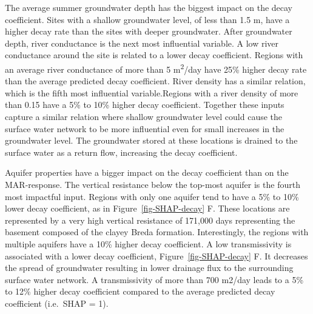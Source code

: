 \documentclass[
]{agujournal2019}
\begin{document}
The average summer groundwater depth has the biggest impact on the decay
coefficient. Sites with a shallow groundwater level, of less than 1.5 m,
have a higher decay rate than the sites with deeper groundwater. After
groundwater depth, river conductance is the next most influential
variable. A low river conductance around the site is related to a lower
decay coefficient. Regions with an average river conductance of more
than 5 m\textsuperscript{2}/day have 25\% higher decay rate than the
average predicted decay coefficient. River density has a similar
relation, which is the fifth most influential variable.Regions with a
river density of more than 0.15 have a 5\% to 10\% higher decay
coefficient. Together these inputs capture a similar relation where
shallow groundwater level could cause the surface water network to be
more influential even for small increases in the groundwater level. The
groundwater stored at these locations is drained to the surface water as
a return flow, increasing the decay coefficient.

Aquifer properties have a bigger impact on the decay coefficient than on
the MAR-response. The vertical resistance below the top-most aquifer is
the fourth most impactful input. Regions with only one aquifer tend to
have a 5\% to 10\% lower decay coefficient, as in
Figure~\ref{fig-SHAP-decay} F. These locations are represented by a very
high vertical resistance of 171,000 days representing the basement
composed of the clayey Breda formation. Interestingly, the regions with
multiple aquifers have a 10\% higher decay coefficient. A low
transmissivity is associated with a lower decay coefficient,
Figure~\ref{fig-SHAP-decay} F. It decreases the spread of groundwater
resulting in lower drainage flux to the surrounding surface water
network. A transmissivity of more than 700 m2/day leads to a 5\% to 12\%
higher decay coefficient compared to the average predicted decay
coefficient (i.e.~SHAP = 1).
\end{document}
